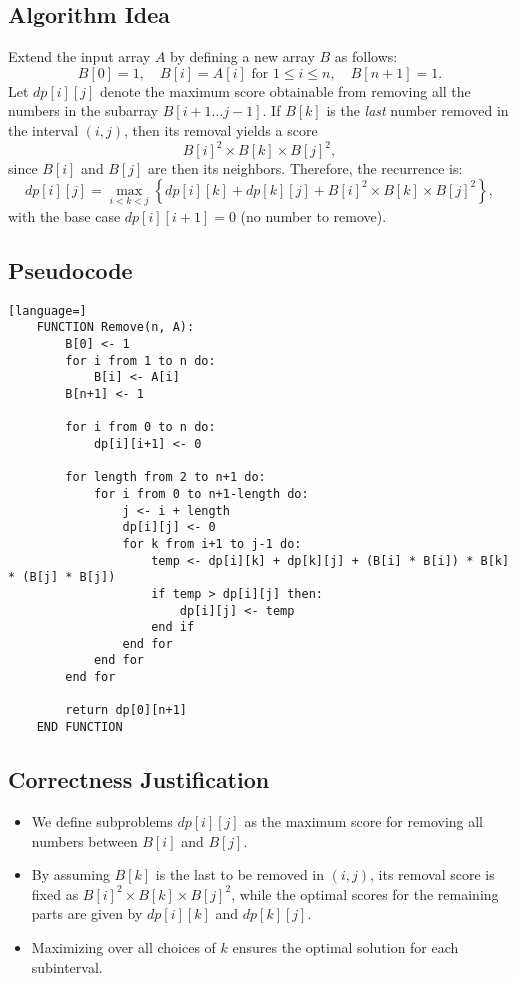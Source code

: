 \documentclass[letterpaper, 11pt]{article}
\newcommand{\1}{\mathds{1}}	%
\theoremstyle{definition}
\newenvironment{solution}{{\par\noindent\it Solution.}}{}
\begin{document}
\begin{solution}
    \subsection*{Algorithm Idea}
    Extend the input array \(A\) by defining a new array \(B\) as follows:
    \[
    B[0] = 1,\quad B[i] = A[i] \text{ for } 1\leq i\leq n,\quad B[n+1] = 1.
    \]
    Let \(dp[i][j]\) denote the maximum score obtainable from removing all the numbers in the subarray \(B[i+1 \ldots j-1]\). If \(B[k]\) is the \emph{last} number removed in the interval \((i,j)\), then its removal yields a score
    \[
    B[i]^2 \times B[k] \times B[j]^2,
    \]
    since \(B[i]\) and \(B[j]\) are then its neighbors. Therefore, the recurrence is:
    \[
    dp[i][j] = \max_{i < k < j} \left\{ dp[i][k] + dp[k][j] + B[i]^2 \times B[k] \times B[j]^2 \right\},
    \]
    with the base case \(dp[i][i+1] = 0\) (no number to remove).
    
    \subsection*{Pseudocode}
    
    \begin{lstlisting}[language=]
    FUNCTION Remove(n, A):
        B[0] <- 1
        for i from 1 to n do:
            B[i] <- A[i]
        B[n+1] <- 1

        for i from 0 to n do:
            dp[i][i+1] <- 0
    
        for length from 2 to n+1 do:
            for i from 0 to n+1-length do:
                j <- i + length
                dp[i][j] <- 0
                for k from i+1 to j-1 do:
                    temp <- dp[i][k] + dp[k][j] + (B[i] * B[i]) * B[k] * (B[j] * B[j])
                    if temp > dp[i][j] then:
                        dp[i][j] <- temp
                    end if
                end for
            end for
        end for
    
        return dp[0][n+1]
    END FUNCTION
    \end{lstlisting}
    
    \subsection*{Correctness Justification}
    \begin{itemize}
        \item We define subproblems \(dp[i][j]\) as the maximum score for removing all numbers between \(B[i]\) and \(B[j]\).  
        \item By assuming \(B[k]\) is the last to be removed in \((i,j)\), its removal score is fixed as \(B[i]^2 \times B[k] \times B[j]^2\), while the optimal scores for the remaining parts are given by \(dp[i][k]\) and \(dp[k][j]\).  
        \item Maximizing over all choices of \(k\) ensures the optimal solution for each subinterval.
    \end{itemize}
    

\end{solution}
\end{document}
